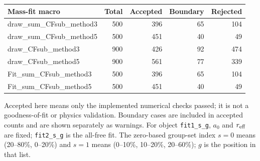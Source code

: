 \documentclass[11pt,a4paper]{article}
\begin{document}
{\small\begin{longtable}{lrrrr}\hline Mass-fit macro & Total & Accepted & Boundary & Rejected\\\hline\endhead
draw\_sum\_CFsub\_method3 & 500 & 396 & 65 & 104\\
draw\_sum\_CFsub\_method5 & 500 & 451 & 40 & 49\\
draw\_CFsub\_method3 & 900 & 426 & 92 & 474\\
draw\_CFsub\_method5 & 900 & 561 & 77 & 339\\
Fit\_sum\_CFsub\_method3 & 500 & 396 & 65 & 104\\
Fit\_sum\_CFsub\_method5 & 500 & 451 & 40 & 49\\
\hline\end{longtable}}
Accepted here means only the implemented numerical checks passed; it is not a goodness-of-fit or physics validation. Boundary cases are included in accepted counts and are shown separately as warnings.
For object \texttt{fit1\_s\_g}, $a_0$ and $r_{\rm eff}$ are fixed; \texttt{fit2\_s\_g} is the all-free fit. The zero-based group-set index $s=0$ means (20--80\%, 0--20\%) and $s=1$ means (0--10\%, 10--20\%, 20--60\%); $g$ is the position in that list.
\end{document}
